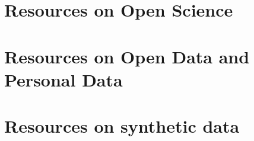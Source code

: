 
\label{resources}

\section{Resources on Open Science}
\section{Resources on Open Data and Personal Data}
\section{Resources on synthetic data}
